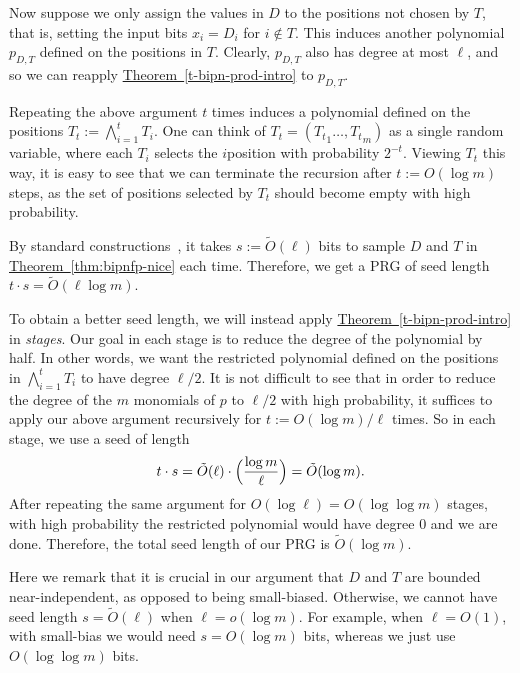 \documentclass[11pt]{article}
\numberwithin{equation}{section}
\theoremstyle{definition}
\theoremstyle{plain}
\newcommand{\expref}[2]{\hyperref[#2]{#1~\ref{#2}}}
\def\Blocklength{\ell}
\begin{document}
Now suppose we only assign the values in $D$ to the positions not chosen by $T$, that is, setting the input bits $x_i = D_i$ for $i \not\in T$.
This induces another polynomial $p_{D,T}$ defined on the positions in $T$.
Clearly, $p_{D,T}$ also has degree at most $\Blocklength$, and so we can reapply \expref{Theorem}{t-bipn-prod-intro} to $p_{D,T}$.

Repeating the above argument $t$ times induces a polynomial defined on the positions
%
$T_t := \bigwedge_{i=1}^t T_i$.
One can think of $T_t = ({T_t}_1 \ldots, {T_t}_m)$ as a single random variable, where each $T_i$ selects the $i$position with probability $2^{-t}$.
Viewing $T_t$ this way, it is easy to see that we can terminate the recursion after $t := O(\log m)$ steps, as the set of positions selected by $T_t$ should become empty with high probability.

By standard constructions~\cite{NaorN93}, it takes $s := \tilde O(\Blocklength)$ bits to sample $D$ and $T$ in \expref{Theorem}{thm:bipnfp-nice} each time.
Therefore, we get a PRG of seed length $t \cdot s = \tilde O(\Blocklength \log m)$.

To obtain a better seed length, we will instead apply \expref{Theorem}{t-bipn-prod-intro} in \emph{stages}.
Our goal in each stage is to reduce the degree of the polynomial by half.
In other words, we want the restricted polynomial defined on the positions in
%
$\bigwedge_{i=1}^t T_i$  %
to have degree $\Blocklength/2$.
It is not difficult to see that in order to reduce the degree of the $m$ monomials of $p$ to $\Blocklength/2$ with high probability, it suffices to apply our above argument recursively for $t := O(\log m) / \Blocklength$ times.
So in each stage, we use a seed of length
\[
  t \cdot s = \tilde O(\Blocklength) \cdot \Bigl( \frac{\log m}{\Blocklength} \Bigr) = \tilde O(\log m) .
\]
After repeating the same argument for $O(\log \Blocklength) = O(\log\log m)$ stages, with high probability the restricted polynomial would have degree $0$ and we are done.
Therefore, the total seed length of our PRG is $\tilde O(\log m)$.

Here we remark that it is crucial in our argument that $D$ and $T$ are bounded near-independent, as opposed to being small-biased.
Otherwise, we cannot have seed length $s = \tilde O(\Blocklength)$ when $\Blocklength = o(\log m)$.
For example, when $\Blocklength = O(1)$, with small-bias we would need $s = O(\log m)$ bits, whereas we just use $O(\log \log m)$ bits.

\medskip
\end{document}
